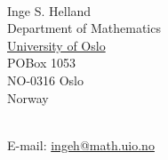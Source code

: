 \documentclass[a4paper, 11pt]{article}
\begin{document}




\bigskip

\ \\
Inge S. Helland \\
Department of Mathematics \\
\href{http://uio.no}{University of Oslo} \\
POBox 1053 \\
NO-0316 Oslo \\
Norway

\ \\
E-mail: \href{mailto:ingeh@math.uio.no}{ingeh@math.uio.no}
\end{document}
